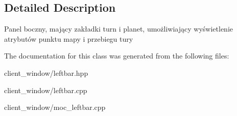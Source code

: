 \subsection{Detailed Description}
Panel boczny, mający zakładki turn i planet, umożliwiający wyświetlenie atrybutów punktu mapy i przebiegu tury 

The documentation for this class was generated from the following files\+:\begin{DoxyCompactItemize}
\item 
client\+\_\+window/leftbar.\+hpp\item 
client\+\_\+window/leftbar.\+cpp\item 
client\+\_\+window/moc\+\_\+leftbar.\+cpp\end{DoxyCompactItemize}
